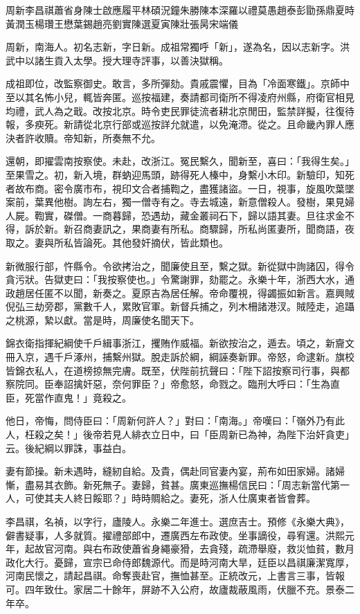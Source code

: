 
\begin{pinyinscope}
周新李昌祺蕭省身陳士啟應履平林碩況鐘朱勝陳本深羅以禮莫愚趙泰彭勖孫鼎夏時黃潤玉楊瓚王懋葉錫趙亮劉實陳選夏寅陳壯張昺宋端儀

周新，南海人。初名志新，字日新。成祖常獨呼「新」，遂為名，因以志新字。洪武中以諸生貢入太學。授大理寺評事，以善決獄稱。

成祖即位，改監察御史。敢言，多所彈劾。貴戚震懼，目為「冷面寒鐵」。京師中至以其名怖小兒，輒皆奔匿。巡按福建，奏請都司衛所不得凌府州縣，府衛官相見均禮，武人為之戢。改按北京。時令吏民罪徒流者耕北京閒田，監禁詳擬，往復待報，多瘐死。新請從北京行部或巡按詳允就遣，以免淹滯。從之。且命畿內罪人應決者許收贖。帝知新，所奏無不允。

還朝，即擢雲南按察使。未赴，改浙江。冤民繫久，聞新至，喜曰：「我得生矣。」至果雪之。初，新入境，群蚋迎馬頭，跡得死人榛中，身繫小木印。新驗印，知死者故布商。密令廣市布，視印文合者捕鞫之，盡獲諸盜。一日，視事，旋風吹葉墜案前，葉異他樹。詢左右，獨一僧寺有之。寺去城遠，新意僧殺人。發樹，果見婦人屍。鞫實，磔僧。一商暮歸，恐遇劫，藏金叢祠石下，歸以語其妻。旦往求金不得，訴於新。新召商妻訊之，果商妻有所私。商驟歸，所私尚匿妻所，聞商語，夜取之。妻與所私皆論死。其他發奸摘伏，皆此類也。

新微服行部，忤縣令。令欲拷治之，聞廉使且至，繫之獄。新從獄中詢諸囚，得令貪污狀。告獄吏曰：「我按察使也。」令驚謝罪，劾罷之。永樂十年，浙西大水，通政趙居任匿不以聞，新奏之。夏原吉為居任解。帝命覆視，得蠲振如新言。嘉興賊倪弘三劫旁郡，黨數千人，累敗官軍。新督兵捕之，列木柵諸港汊。賊陸走，追躡之桃源，縶以獻。當是時，周廉使名聞天下。

錦衣衛指揮紀綱使千戶緝事浙江，攫賄作威福。新欲按治之，遁去。頃之，新齎文冊入京，遇千戶涿州，捕繫州獄。脫走訴於綱，綱誣奏新罪。帝怒，命逮新。旗校皆錦衣私人，在道榜掠無完膚。既至，伏陛前抗聲曰：「陛下詔按察司行事，與都察院同。臣奉詔擒奸惡，奈何罪臣？」帝愈怒，命戮之。臨刑大呼曰：「生為直臣，死當作直鬼！」竟殺之。

他日，帝悔，問侍臣曰：「周新何許人？」對曰：「南海。」帝嘆曰：「嶺外乃有此人，枉殺之矣！」後帝若見人緋衣立日中，曰「臣周新已為神，為陛下治奸貪吏」云。後紀綱以罪誅，事益白。

妻有節操。新未遇時，縫紉自給。及貴，偶赴同官妻內宴，荊布如田家婦。諸婦慚，盡易其衣飾。新死無子。妻歸，貧甚。廣東巡撫楊信民曰：「周志新當代第一人，可使其夫人終日餒耶？」時時賙給之。妻死，浙人仕廣東者皆會葬。

李昌祺，名禎，以字行，廬陵人。永樂二年進士。選庶吉士。預修《永樂大典》，僻書疑事，人多就質。擢禮部郎中，遷廣西左布政使。坐事謫役，尋宥還。洪熙元年，起故官河南。與右布政使蕭省身繩豪猾，去貪殘，疏滯舉廢，救災恤貧，數月政化大行。憂歸，宣宗已命侍郎魏源代。而是時河南大旱，廷臣以昌祺廉潔寬厚，河南民懷之，請起昌祺。命奪喪赴官，撫恤甚至。正統改元，上書言三事，皆報可。四年致仕。家居二十餘年，屏跡不入公府，故廬裁蔽風雨，伏臘不充。景泰二年卒。


\end{pinyinscope}
